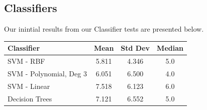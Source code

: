 \documentclass{article}
\begin{document}
\subsection{Classifiers}
Our inintial results from our Classifier tests are presented below. 

\begin{center}
\begin{tabular}{l|c|c|c}
Classifier & Mean & Std Dev & Median\\
\hline
SVM - RBF & 5.811 & 4.346 & 5.0 \\
SVM - Polynomial, Deg 3 & 6.051 & 6.500 & 4.0 \\
SVM - Linear & 7.518 & 6.123 & 6.0 \\
Decision Trees & 7.121 & 6.552 & 5.0
\end{tabular}
\end{center}
\end{document}
